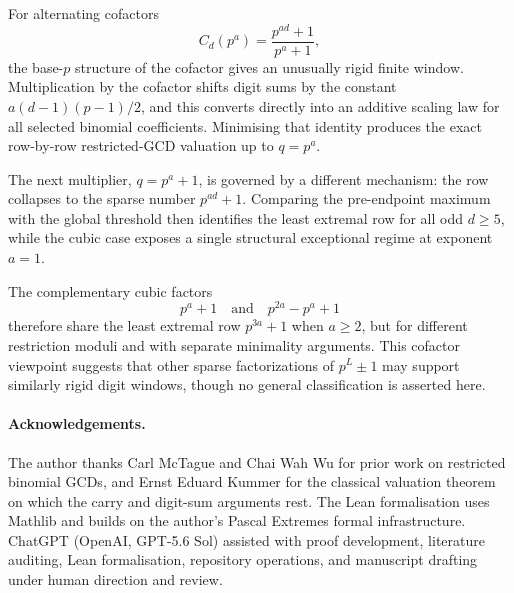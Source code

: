 \documentclass[11pt]{article}
\theoremstyle{definition}
\theoremstyle{remark}
\begin{document}
For alternating cofactors
\[
  C_d(p^a)=\frac{p^{ad}+1}{p^a+1},
\]
the base-\(p\) structure of the cofactor gives an unusually rigid finite
window.  Multiplication by the cofactor shifts digit sums by the constant
\(a(d-1)(p-1)/2\), and this converts directly into an additive scaling law for
all selected binomial coefficients.  Minimising that identity produces the
exact row-by-row restricted-GCD valuation up to \(q=p^a\).

The next multiplier, \(q=p^a+1\), is governed by a different mechanism: the
row collapses to the sparse number \(p^{ad}+1\).  Comparing the pre-endpoint
maximum with the global threshold then identifies the least extremal row for
all odd \(d\ge5\), while the cubic case exposes a single structural
exceptional regime at exponent \(a=1\).

The complementary cubic factors
\[
  p^a+1
  \quad\text{and}\quad
  p^{2a}-p^a+1
\]
therefore share the least extremal row \(p^{3a}+1\) when \(a\ge2\), but for
different restriction moduli and with separate minimality arguments.  This
cofactor viewpoint suggests that other sparse factorizations of
\(p^L\pm1\) may support similarly rigid digit windows, though no general
classification is asserted here.

\paragraph{Acknowledgements.}
The author thanks Carl McTague and Chai Wah Wu for prior work on restricted
binomial GCDs, and Ernst Eduard Kummer for the classical valuation theorem on
which the carry and digit-sum arguments rest.  The Lean formalisation uses
Mathlib and builds on the author's Pascal Extremes formal infrastructure.
ChatGPT (OpenAI, GPT-5.6 Sol) assisted with proof development, literature
auditing, Lean formalisation, repository operations, and manuscript drafting
under human direction and review.



\end{document}
